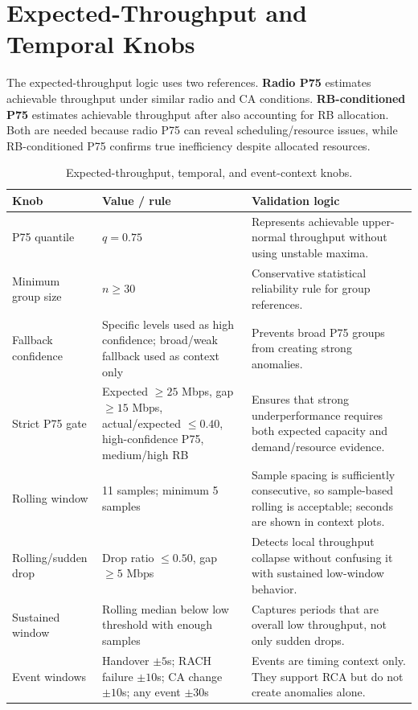 \documentclass[12pt,a4paper]{article}
\begin{document}
\section{Expected-Throughput and Temporal Knobs}
The expected-throughput logic uses two references. \textbf{Radio P75} estimates achievable throughput under similar radio and CA conditions. \textbf{RB-conditioned P75} estimates achievable throughput after also accounting for RB allocation. Both are needed because radio P75 can reveal scheduling/resource issues, while RB-conditioned P75 confirms true inefficiency despite allocated resources.

\begin{table}[H]
\centering
\scriptsize
\begin{tabularx}{\textwidth}{P{3.1cm}P{4.9cm}Y}
\toprule
\textbf{Knob} & \textbf{Value / rule} & \textbf{Validation logic} \\
\midrule
P75 quantile & $q=0.75$ & Represents achievable upper-normal throughput without using unstable maxima. \\
Minimum group size & $n \geq 30$ & Conservative statistical reliability rule for group references. \\
Fallback confidence & Specific levels used as high confidence; broad/weak fallback used as context only & Prevents broad P75 groups from creating strong anomalies. \\
Strict P75 gate & Expected $\geq25$ Mbps, gap $\geq15$ Mbps, actual/expected $\leq0.40$, high-confidence P75, medium/high RB & Ensures that strong underperformance requires both expected capacity and demand/resource evidence. \\
Rolling window & 11 samples; minimum 5 samples & Sample spacing is sufficiently consecutive, so sample-based rolling is acceptable; seconds are shown in context plots. \\
Rolling/sudden drop & Drop ratio $\leq0.50$, gap $\geq5$ Mbps & Detects local throughput collapse without confusing it with sustained low-window behavior. \\
Sustained window & Rolling median below low threshold with enough samples & Captures periods that are overall low throughput, not only sudden drops. \\
Event windows & Handover $\pm5$s; RACH failure $\pm10$s; CA change $\pm10$s; any event $\pm30$s & Events are timing context only. They support RCA but do not create anomalies alone. \\
\bottomrule
\end{tabularx}
\caption{Expected-throughput, temporal, and event-context knobs.}
\label{tab:p75_temporal_knobs}
\end{table}
\end{document}

